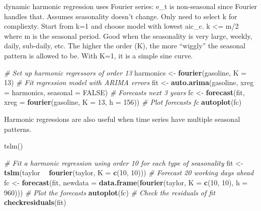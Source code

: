 \documentclass[]{book}
\newenvironment{Shaded}{\begin{snugshade}}{\end{snugshade}}
\newcommand{\KeywordTok}[1]{\textcolor[rgb]{0.13,0.29,0.53}{\textbf{#1}}}
\newcommand{\DataTypeTok}[1]{\textcolor[rgb]{0.13,0.29,0.53}{#1}}
\newcommand{\DecValTok}[1]{\textcolor[rgb]{0.00,0.00,0.81}{#1}}
\newcommand{\StringTok}[1]{\textcolor[rgb]{0.31,0.60,0.02}{#1}}
\newcommand{\CommentTok}[1]{\textcolor[rgb]{0.56,0.35,0.01}{\textit{#1}}}
\newcommand{\OtherTok}[1]{\textcolor[rgb]{0.56,0.35,0.01}{#1}}
\newcommand{\OperatorTok}[1]{\textcolor[rgb]{0.81,0.36,0.00}{\textbf{#1}}}
\newcommand{\NormalTok}[1]{#1}
\begin{document}
dynamic harmonic regression uses Fourier series: e\_t is non-seasonal
since Fourier handles that. Assumes seasonality doesn't change. Only
need to select k for compliexty. Start from k=1 and choose model with
lowest aic\_c. k \textless{}= m/2 where m is the seasonal period. Good
when the seasonality is very large, weekly, daily, sub-daily, etc. The
higher the order (K), the more ``wiggly'' the seasonal pattern is
allowed to be. With K=1, it is a simple sine curve.

\begin{Shaded}
\begin{Highlighting}[]
\CommentTok{# Set up harmonic regressors of order 13}
\NormalTok{harmonics <-}\StringTok{ }\KeywordTok{fourier}\NormalTok{(gasoline, }\DataTypeTok{K =} \DecValTok{13}\NormalTok{)}
\CommentTok{# Fit regression model with ARIMA errors}
\NormalTok{fit <-}\StringTok{ }\KeywordTok{auto.arima}\NormalTok{(gasoline, }\DataTypeTok{xreg =}\NormalTok{ harmonics, }\DataTypeTok{seasonal =} \OtherTok{FALSE}\NormalTok{)}
\CommentTok{# Forecasts next 3 years}
\NormalTok{fc <-}\StringTok{ }\KeywordTok{forecast}\NormalTok{(fit, }\DataTypeTok{xreg =} \KeywordTok{fourier}\NormalTok{(gasoline, }\DataTypeTok{K =} \DecValTok{13}\NormalTok{, }\DataTypeTok{h =} \DecValTok{156}\NormalTok{))}
\CommentTok{# Plot forecasts fc}
\KeywordTok{autoplot}\NormalTok{(fc)}
\end{Highlighting}
\end{Shaded}

Harmonic regressions are also useful when time series have multiple
seasonal patterns.

tslm()

\begin{Shaded}
\begin{Highlighting}[]
\CommentTok{# Fit a harmonic regression using order 10 for each type of seasonality}
\NormalTok{fit <-}\StringTok{ }\KeywordTok{tslm}\NormalTok{(taylor }\OperatorTok{~}\StringTok{ }\KeywordTok{fourier}\NormalTok{(taylor, }\DataTypeTok{K =} \KeywordTok{c}\NormalTok{(}\DecValTok{10}\NormalTok{, }\DecValTok{10}\NormalTok{)))}
\CommentTok{# Forecast 20 working days ahead}
\NormalTok{fc <-}\StringTok{ }\KeywordTok{forecast}\NormalTok{(fit, }\DataTypeTok{newdata =} \KeywordTok{data.frame}\NormalTok{(}\KeywordTok{fourier}\NormalTok{(taylor, }\DataTypeTok{K =} \KeywordTok{c}\NormalTok{(}\DecValTok{10}\NormalTok{, }\DecValTok{10}\NormalTok{), }\DataTypeTok{h =} \DecValTok{960}\NormalTok{)))}
\CommentTok{# Plot the forecasts}
\KeywordTok{autoplot}\NormalTok{(fc)}
\CommentTok{# Check the residuals of fit}
\KeywordTok{checkresiduals}\NormalTok{(fit)}
\end{Highlighting}
\end{Shaded}
\end{document}

